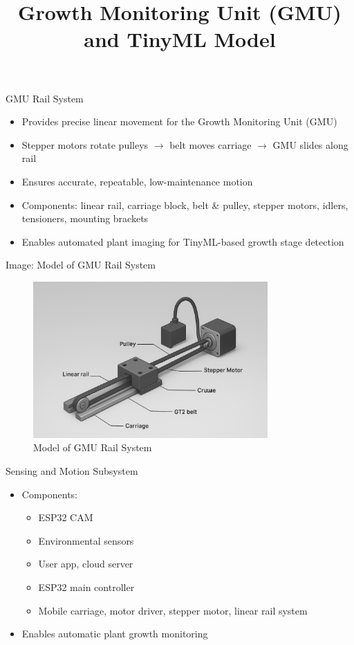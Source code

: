\documentclass{beamer}
\title{Growth Monitoring Unit (GMU) and TinyML Model}
\author{}
\date{}
\begin{document}
\frame{\titlepage}

\begin{frame}{GMU Rail System}
    \begin{itemize}
        \item Provides precise linear movement for the Growth Monitoring Unit (GMU)
        \item Stepper motors rotate pulleys $\rightarrow$ belt moves carriage $\rightarrow$ GMU slides along rail
        \item Ensures accurate, repeatable, low-maintenance motion
        \item Components: linear rail, carriage block, belt \& pulley, stepper motors, idlers, tensioners, mounting brackets
        \item Enables automated plant imaging for TinyML-based growth stage detection
    \end{itemize}
\end{frame}

\begin{frame}{Image: Model of GMU Rail System}
    \begin{figure}
        \centering
        \includegraphics[width=0.8\textwidth]{railmodel.png}
        \caption{Model of GMU Rail System}
    \end{figure}
\end{frame}

\begin{frame}{Sensing and Motion Subsystem}
    \begin{itemize}
        \item Components:
        \begin{itemize}
            \item ESP32 CAM
            \item Environmental sensors
            \item User app, cloud server
            \item ESP32 main controller
            \item Mobile carriage, motor driver, stepper motor, linear rail system
        \end{itemize}
        \item Enables automatic plant growth monitoring
    \end{itemize}
\end{frame}
\end{document}
